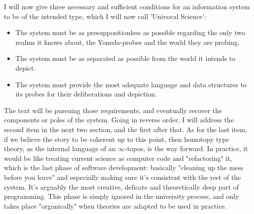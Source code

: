 \documentclass[11pt]{article}
\begin{document}
I will now give three necessary and sufficient conditions for an information system to
be of the intended type, which I will now call 'Univocal Science':

\begin{itemize}

\item The system must be as presuppositionless as possible regarding the only two realms it
knows about, the Yoneda-probes and the world they are probing.

\item The system must be as separated as possible from the world it intends to depict.

\item The system must provide the most adequate language and data structures to its probes for
their deliberations and depiction.

\end{itemize}

The text will be pursuing those requirements, and eventually recover the components or
poles of the system. Going in reverse order, I will address the second item in the next
two section, and the first after that. As for the last item, if we believe the story to
be coherent up to this point, then homotopy type theory, as the internal language of an
\(\infty\)-topos, is the way forward. In practice, it would be like treating current
science as computer code and "refactoring" it, which is the last phase of software
development: basically "cleaning up the mess before you leave" and especially making
sure it's consistent with the rest of the system. It's arguably the most creative,
delicate and theoretically deep part of programming. This phase is simply ignored in the
university process, and only takes place "organically" when theories are adapted to be
used in practice.
\end{document}
